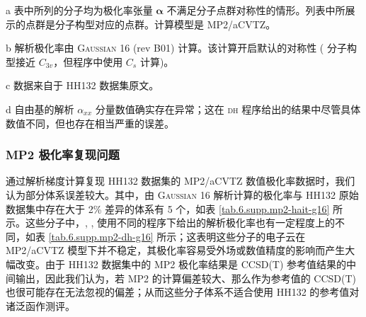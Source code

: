 \begin{table}[!ht]
{\begin{tabular}{lld{4.4}d{2.3}d{2.3}d{2.3}d{2.3}d{2.3}}
    \bottomrule
    \end{tabular}
}{
    \item[a] 表中所列的分子均为极化率张量 $\bm{\alpha}$ 不满足分子点群对称性的情形。列表中所展示的点群是分子构型对应的点群。计算模型是 MP2/aCVTZ。
    \item[b] 解析极化率由 \textsc{Gaussian 16} (rev B01)\cite{Gaussian16} 计算。该计算开启默认的对称性 ( 分子构型接近 $C_{3v}$，但程序中使用 $C_s$ 计算)。
    \item[c] 数据来自于 HH132 数据集原文\cite{Hait-Head-Gordon.PCCP.2018}。
    \item[d]  自由基的解析 $\alpha_{xx}$ 分量数值确实存在异常；这在 \textsc{dh} 程序给出的结果中尽管具体数值不同，但也存在相当严重的误差。
}
\end{table}

\subsubsection{MP2 极化率复现问题}

通过解析梯度计算复现 HH132 数据集的 MP2/aCVTZ 数值极化率数据时，我们认为部分体系误差较大。其中，由 \textsc{Gaussian 16} 解析计算的极化率与 HH132 原始数据集中存在大于 2\% 差异的体系有 5 个，如表 \ref{tab.6.supp.mp2-hait-g16} 所示。这些分子中，, ,  使用不同的程序下给出的解析极化率也有一定程度上的不同，如表 \ref{tab.6.supp.mp2-dh-g16} 所示；这表明这些分子的电子云在 MP2/aCVTZ 模型下并不稳定，其极化率容易受外场或数值精度的影响而产生大幅改变。由于 HH132 数据集中的 MP2 极化率结果是 CCSD(T) 参考值结果的中间输出，因此我们认为，若 MP2 的计算偏差较大、那么作为参考值的 CCSD(T) 也很可能存在无法忽视的偏差；从而这些分子体系不适合使用 HH132 的参考值对诸泛函作测评。

